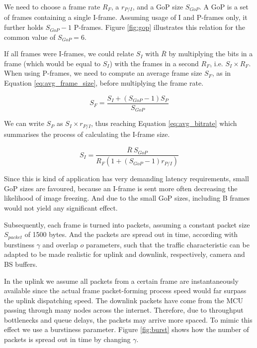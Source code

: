 We need to choose a frame rate $R_F$, a $r_{P/I}$, and a \ac{GoP} size $S_{GoP}$. A \ac{GoP} is a set of frames containing a single I-frame. Assuming usage of I and P-frames only, it further holds $S_{GoP} - 1$ P-frames. Figure \ref{fig:gop} illustrates this relation for the common value of $S_{GoP} = 6$.





If all frames were I-frames, we could relate $S_I$ with $\overline{R}$ by multiplying the bits in a frame (which would be equal to $S_I$) with the frames in a second $R_F$, i.e. $S_I \times R_F$. When using P-frames, we need to compute an average frame size $S_F$, as in Equation \eqref{eq:avg_frame_size}, before multiplying the frame rate.


\begin{equation} \label{eq:avg_frame_size}
    S_F = \frac{S_I + (S_{GoP} - 1) S_P}{S_{GoP}}
\end{equation}


We can write $S_P$ as $ S_I \times r_{P/I}$, thus reaching Equation \eqref{eq:avg_bitrate} which summarises the process of calculating the I-frame size.

\begin{equation} \label{eq:avg_bitrate} 
    S_I = \frac{\overline{R} \ S_{GoP}}{R_F \left( 1 + (S_{GoP} - 1) r_{P/I}\right)}
\end{equation}

Since this is kind of application has very demanding latency requirements, small GoP sizes are favoured, because an I-frame is sent more often decreasing the likelihood of image freezing. And due to the small GoP sizes, including B frames would not yield any significant effect.

Subsequently, each frame is turned into packets, assuming a constant packet size $S_{packet}$ of 1500 bytes. And the packets are spread out in time, according with burstiness $\gamma$ and overlap $o$ parameters, such that the traffic characteristic can be adapted to be made realistic for uplink and downlink, respectively, camera and BS buffers.

In the uplink we assume all packets from a certain frame are instantaneously available since the actual frame packet-forming process speed would far surpass the uplink dispatching speed. The downlink packets have come from the \acs{MCU} passing through many nodes across the internet. Therefore, due to throughput bottlenecks and queue delays, the packets may arrive more spaced. To mimic this effect we use a burstiness parameter. Figure \ref{fig:burst} shows how the number of packets is spread out in time by changing $\gamma$.

